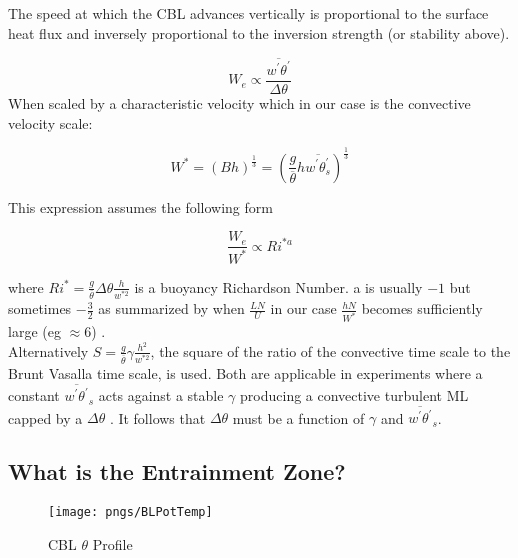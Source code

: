 The speed at which the CBL advances vertically is proportional to the surface heat flux and inversely proportional to the inversion strength (or stability above).

\begin{equation}
W_{e} \propto \frac{\overline{w^{'}\theta^{'}}}{\Delta \theta}  
\end{equation}
\cite{Deardorff79}
When scaled by a characteristic velocity which in our case is the convective velocity scale: 

\begin{equation}
W^{*} = \left( B h \right)^{\frac{1}{3}}  
= \left( \frac{g}{\overline{\theta}} h \overline{w^{'}\theta^{'}_{s}} \right)^{\frac{1}{3}}
\end{equation}

This expression assumes the following form

\begin{equation}
\frac{W_{e}}{W^{*}} \propto Ri^{*a}  
\end{equation}

where $Ri^{*} = \frac{g}{\overline{\theta}} \Delta \theta \frac{h}{w^{*2}}$ is a buoyancy Richardson Number. a is usually $-1$ but sometimes $-\frac{3}{2}$ as summarized by \citeauthor{Turner86} when $\frac{LN}{U}$ in our case $\frac{hN}{W^{*}}$ becomes sufficiently large (eg $\approx 6$) \cite{Turner86}.
\\

Alternatively $S = \frac{g}{\overline{\theta}} \gamma \frac{h^{2}}{w^{*2}}$,  the square of the ratio of the convective time scale to the Brunt Vasalla time scale, is used. \cite{Deardorff79}  Both are applicable in experiments where a constant $\overline{w^{'}\theta^{'}}_{s}$ acts against a stable $\gamma$ producing a convective turbulent ML capped by a $\Delta \theta$ \cite{Turner86}. It follows that $\Delta \theta$ must be a function of $\gamma$ and $\overline{w^{'}\theta^{'}}_{s}$.\\
\subsection{What is the Entrainment Zone?} 

\begin{wrapfigure}{r}{0.55\textwidth}
\vspace{-12mm}
  \begin{center}
    \texttt{[image: pngs/BLPotTemp]}
  \end{center}
\vspace{-5mm}
  \caption{CBL $\theta$ Profile \cite{Stull-BLMetIntro}}
  \label{fig:BLPotTemp}
\end{wrapfigure}

